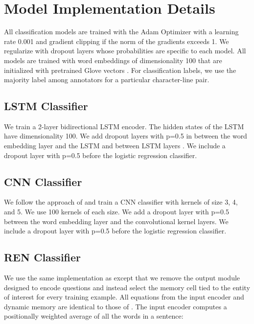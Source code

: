 \documentclass[11pt,a4paper]{article}
\begin{document}
\section{Model Implementation Details}

All classification models are trained with the Adam Optimizer \cite{adam} with a learning rate 0.001 and gradient clipping if the norm of the gradients exceeds 1. We regularize with dropout layers whose probabilities are specific to each model. All models are trained with word embeddings of dimensionality 100 that are initialized with pretrained Glove vectors \cite{pennington2014glove}. For classification labels, we use the majority label among annotators for a particular character-line pair. 

\subsection{LSTM Classifier}

We train a 2-layer bidirectional LSTM encoder. The hidden states of the LSTM have dimensionality 100. We add dropout layers with p=0.5 in between the word embedding layer and the LSTM and between LSTM layers \cite{dropout}. We include a dropout layer with p=0.5 before the logistic regression classifier.

\subsection{CNN Classifier}

We follow the approach of \citet{Kim2014ConvolutionalNN} and train a CNN classifier with kernels of size 3, 4, and 5. We use 100 kernels of each size. We add a dropout layer with p=0.5 between the word embedding layer and the convolutional kernel layers. We include a dropout layer with p=0.5 before the logistic regression classifier. 

\subsection{REN Classifier}

We use the same implementation as \citet{ren} except that we remove the output module designed to encode questions and instead select the memory cell tied to the entity of interest for every training example. All equations from the input encoder and dynamic memory are identical to those of \cite{ren}. The input encoder computes a positionally weighted average of all the words in a sentence:
\end{document}

